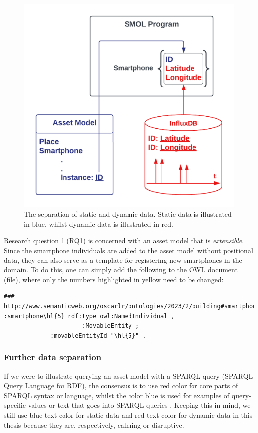 \documentclass{article}
\begin{document}
\begin{figure}[H]
    \centering
    \includegraphics[scale=0.24]{graphics/static_dynamic_asset_model.png}
    \caption{The separation of static and dynamic data. Static data is illustrated in blue, whilst dynamic data is illustrated in red.}
    \label{fig:static_dynamic_asset_model}
\end{figure}

Research question 1 (RQ1) is concerned with an asset model that is \emph{extensible}. Since the smartphone individuals are added to the asset model without positional data, they can also serve as a template for registering new smartphones in the domain. To do this, one can simply add the following to the OWL document (file), where only the numbers highlighted in yellow need to be changed:

\begin{Verbatim}[commandchars=\\\{\}, breakanywhere=true]
### http://www.semanticweb.org/oscarlr/ontologies/2023/2/building#smartphone\hl{5}
:smartphone\hl{5} rdf:type owl:NamedIndividual ,
                      :MovableEntity ;
             :movableEntityId "\hl{5}" .
\end{Verbatim}

\subsubsection{Further data separation}\label{subsubsec:FurtherDataSeparation}
If we were to illustrate querying an asset model with a SPARQL query (SPARQL Query Language for RDF), the consensus is to use red color for core parts of SPARQL syntax or language, whilst the color blue is used for examples of query-specific values or text that goes into SPARQL queries \cite{noauthor_sparql_nodate}. Keeping this in mind, we still use blue text color for static data and red text color for dynamic data in this thesis because they are, respectively, calming or disruptive. 
\end{document}

